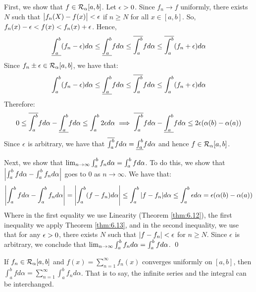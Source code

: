 \begin{nproof}
    First, we show that $f \in \mathcal{R}_{\alpha}[a, b]$. Let $\epsilon > 0$. Since $f_n \rightarrow f$ uniformly, there exists $N$ such that $\abs{f_n(X) - f(x)} < \epsilon$ if $n \geq N$ for all $x \in [a, b]$. So, $f_n(x) - \epsilon < f(x) < f_n(x) + \epsilon$. Hence,
    \begin{align*}
        \underline{\int_{a}^{b}}(f_n - \epsilon)d\alpha \leq \underline{\int_{a}^{b}}fd\alpha \leq \overline{\int_{a}^{b}} fd\alpha \leq \overline{\int_{a}^{b}}(f_n + \epsilon)d\alpha 
    \end{align*}
    Since $f_n \pm \epsilon \in \mathcal{R}_{\alpha}[a, b]$, we have that:
    \begin{align*}
        \int_{a}^b (f_n - \epsilon)d\alpha \leq \underline{\int_{a}^{b}}fd\alpha \leq \overline{\int_{a}^{b}} fd\alpha \leq \int_a^b(f_n + \epsilon)d\alpha 
    \end{align*}
    Therefore:
    \begin{align*}
        0 \leq \overline{\int_{a}^{b}} fd\alpha - \underline{\int_{a}^{b}} fd\alpha \leq \int_a^b 2\epsilon d\alpha \implies \overline{\int_{a}^{b}} fd\alpha - \underline{\int_{a}^{b}} fd\alpha \leq 2\epsilon(\alpha(b) - \alpha(a))
    \end{align*}
    Since $\epsilon$ is arbitrary, we have that $\overline{\int_{a}^{b}} fd\alpha = \underline{\int_{a}^{b}} fd\alpha$ and hence $f \in \mathcal{R}_\alpha[a, b]$.

    Next, we show that $\lim_{n \rightarrow \infty} \int_{a}^b f_n d\alpha = \int_a^b f d\alpha$. To do this, we show that $\abs{\int_a^b fd\alpha - \int_a^bf_nd\alpha}$ goes to 0 as $n \rightarrow \infty$. We have that:
    \begin{align*}
        \abs{\int_a^b fd\alpha - \int_a^bf_nd\alpha} = \abs{\int_a^b (f - f_n)d\alpha} \leq \int_a^b\abs{f - f_n}d\alpha \leq \int_a^b \epsilon d\alpha = \epsilon(\alpha(b) - \alpha(a))
    \end{align*}
    Where in the first equality we use Linearity (Theorem \ref{thm:6.12}), the first inequality we apply Theorem \ref{thm:6.13}, and in the second inequality, we use that for any $\epsilon > 0$, there exists $N$ such that $\abs{f - f_n} < \epsilon$ for $n \geq N$. Since $\epsilon$ is arbitrary, we conclude that $\lim_{n \rightarrow \infty} \int_{a}^b f_n d\alpha = \int_a^b f d\alpha$. \qed
\end{nproof}

\begin{ncorollary}{}{}
    If $f_n \in \mathcal{R}_\alpha[a, b]$ and $f(x) = \sum_{n=1}^\infty f_n(x)$ converges uniformly on $[a, b]$, then $\int_a^b fd\alpha = \sum_{n=1}^\infty \int_a^b f_n d\alpha$. That is to say, the infinite series and the integral can be interchanged.
\end{ncorollary}

